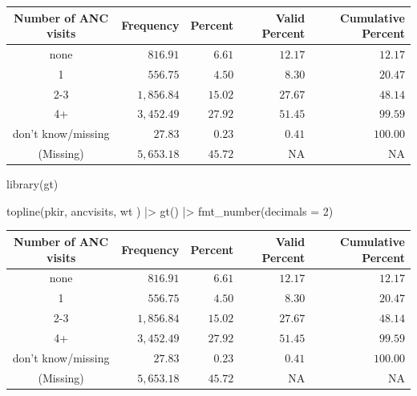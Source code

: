 \documentclass[
  letterpaper,
  DIV=11,
  numbers=noendperiod]{scrartcl}
\newenvironment{Shaded}{\begin{snugshade}}{\end{snugshade}}
\newcommand{\AttributeTok}[1]{\textcolor[rgb]{0.40,0.45,0.13}{#1}}
\newcommand{\DecValTok}[1]{\textcolor[rgb]{0.68,0.00,0.00}{#1}}
\newcommand{\FunctionTok}[1]{\textcolor[rgb]{0.28,0.35,0.67}{#1}}
\newcommand{\NormalTok}[1]{\textcolor[rgb]{0.00,0.23,0.31}{#1}}
\newcommand{\SpecialCharTok}[1]{\textcolor[rgb]{0.37,0.37,0.37}{#1}}
\begin{document}
\begin{longtable*}{crrrr}
\toprule
Number of ANC visits & Frequency & Percent & Valid Percent & Cumulative Percent \\ 
\midrule
none & $816.91$ & $6.61$ & $12.17$ & $12.17$ \\ 
1 & $556.75$ & $4.50$ & $8.30$ & $20.47$ \\ 
2-3 & $1,856.84$ & $15.02$ & $27.67$ & $48.14$ \\ 
4+ & $3,452.49$ & $27.92$ & $51.45$ & $99.59$ \\ 
don't know/missing & $27.83$ & $0.23$ & $0.41$ & $100.00$ \\ 
(Missing) & $5,653.18$ & $45.72$ & NA & NA \\ 
\bottomrule
\end{longtable*}

\begin{Shaded}
\begin{Highlighting}[]
\FunctionTok{library}\NormalTok{(gt)}

\FunctionTok{topline}\NormalTok{(pkir, ancvisits, wt ) }\SpecialCharTok{|\textgreater{}} 
  \FunctionTok{gt}\NormalTok{() }\SpecialCharTok{|\textgreater{}} \FunctionTok{fmt\_number}\NormalTok{(}\AttributeTok{decimals =} \DecValTok{2}\NormalTok{)}
\end{Highlighting}
\end{Shaded}

\begin{longtable*}{crrrr}
\toprule
Number of ANC visits & Frequency & Percent & Valid Percent & Cumulative Percent \\ 
\midrule
none & $816.91$ & $6.61$ & $12.17$ & $12.17$ \\ 
1 & $556.75$ & $4.50$ & $8.30$ & $20.47$ \\ 
2-3 & $1,856.84$ & $15.02$ & $27.67$ & $48.14$ \\ 
4+ & $3,452.49$ & $27.92$ & $51.45$ & $99.59$ \\ 
don't know/missing & $27.83$ & $0.23$ & $0.41$ & $100.00$ \\ 
(Missing) & $5,653.18$ & $45.72$ & NA & NA \\ 
\bottomrule
\end{longtable*}
\end{document}
